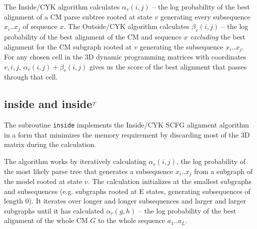 \documentclass[11pt]{article}
\begin{document}
The Inside/CYK algorithm calculates $\alpha_v(i,j)$ -- the log
probability of the best alignment of a CM parse subtree rooted at
state $v$ generating every subsequence $x_i..x_j$ of sequence $x$.
The Outside/CYK algorithm calculates $\beta_v(i,j)$ -- the log
probability of the best alignment of the CM and sequence $x$
\emph{excluding} the best alignment for the CM subgraph rooted at $v$
generating the subsequence $x_i..x_j$.  For any chosen cell in the 3D
dynamic programming matrices with coordinates $v,i,j$, $\alpha_v(i,j)
+ \beta_v(i,j)$ gives us the score of the best alignment that passes
through that cell. 

\subsection{inside and inside$^{\cal{T}}$}

The subroutine \texttt{inside} implements the Inside/CYK SCFG
alignment algorithm in a form that minimizes the memory requirement by
discarding most of the 3D matrix during the calculation.

The algorithm works by iteratively calculating $\alpha_v(i,j)$, the
log probability of the most likely parse tree that generates a
subsequence $x_i..x_j$ from a subgraph of the model rooted at state
$v$. The calculation initializes at the smallest subgraphs and
subsequences (e.g. subgraphs rooted at E states, generating
subsequences of length 0). It iterates over longer and longer
subsequences and larger and larger subgraphs until it has calculated
$\alpha_r(g,h)$ -- the log probability of the best alignment of the
whole CM $G$ to the whole sequence $a_1..a_L$.
\end{document}
